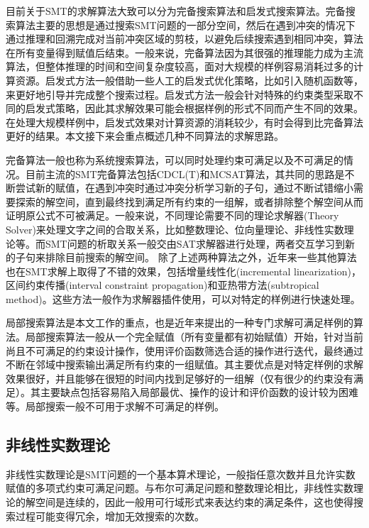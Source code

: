 目前关于SMT的求解算法大致可以分为完备搜索算法和启发式搜索算法。完备搜索算法主要的思想是通过搜索SMT问题的一部分空间，然后在遇到冲突的情况下通过推理和回溯完成对当前冲突区域的剪枝，以避免后续搜索遇到相同冲突，算法在所有变量得到赋值后结束。一般来说，完备算法因为其很强的推理能力成为主流算法，但整体推理的时间和空间复杂度较高，面对大规模的样例容易消耗过多的计算资源。启发式方法一般借助一些人工的启发式优化策略，比如引入随机函数等，来更好地引导并完成整个搜索过程。启发式方法一般会针对特殊的约束类型采取不同的启发式策略，因此其求解效果可能会根据样例的形式不同而产生不同的效果。在处理大规模样例中，启发式效果对计算资源的消耗较少，有时会得到比完备算法更好的结果。本文接下来会重点概述几种不同算法的求解思路。

完备算法一般也称为系统搜索算法，可以同时处理约束可满足以及不可满足的情况。目前主流的SMT完备算法包括CDCL(T)\cite{NieuwenhuisOT06}和MCSAT算法\cite{JovanovicM12,MouraJ13}，其共同的思路是不断尝试新的赋值，在遇到冲突时通过冲突分析学习新的子句，通过不断试错缩小需要探索的解空间，直到最终找到满足所有约束的一组解，或者排除整个解空间从而证明原公式不可被满足。一般来说，不同理论需要不同的理论求解器(Theory Solver)来处理文字之间的合取关系，比如整数理论、位向量理论、非线性实数理论等。而SMT问题的析取关系一般交由SAT求解器进行处理，两者交互学习到新的子句来排除目前搜索的解空间。
除了上述两种算法之外，近年来一些其他算法也在SMT求解上取得了不错的效果，包括增量线性化(incremental linearization)\cite{Incremental2}，区间约束传播(interval constraint propagation)\cite{KhanhO12,TungKO17}和亚热带方法(subtropical method)\cite{FontaineOSV17,NalbachA23}。这些方法一般作为求解器插件使用，可以对特定的样例进行快速处理。


局部搜索算法是本文工作的重点，也是近年来提出的一种专门求解可满足样例的算法。局部搜索算法一般从一个完全赋值（所有变量都有初始赋值）开始，针对当前尚且不可满足的约束设计操作，使用评价函数筛选合适的操作进行迭代，最终通过不断在邻域中搜索输出满足所有约束的一组赋值。其主要优点是对特定样例的求解效果很好，并且能够在很短的时间内找到足够好的一组解（仅有很少的约束没有满足）。其主要缺点包括容易陷入局部最优、操作的设计和评价函数的设计较为困难等。局部搜索一般不可用于求解不可满足的样例。

\subsection{非线性实数理论}
非线性实数理论是SMT问题的一个基本算术理论，一般指任意次数并且允许实数赋值的多项式约束可满足问题。与布尔可满足问题和整数理论相比，非线性实数理论的解空间是连续的，因此一般用可行域形式来表达约束的满足条件，这也使得搜索过程可能变得冗余，增加无效搜索的次数。

